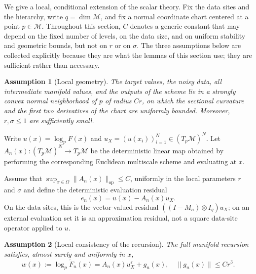 \documentclass[12pt]{article}
\newtheorem{assumption}{Assumption}[section]
\newcommand{\M}{\mathcal{M}}
\begin{document}
We give a local, conditional extension of the scalar theory. Fix the data sites and the hierarchy, write $q=\dim\M$, and fix a normal coordinate chart centered at a point $p\in\M$. Throughout this section, $C$ denotes a generic constant that may depend on the fixed number of levels, on the data size, and on uniform stability and geometric bounds, but not on $r$ or on $\sigma$. The three assumptions below are collected explicitly because they are what the lemmas of this section use; they are sufficient rather than necessary.

\begin{assumption}[Local geometry]\label{ass:geometry}
The target values, the noisy data, all intermediate manifold values, and the outputs of the scheme lie in a strongly convex normal neighborhood of $p$ of radius $Cr$, on which the sectional curvature and the first two derivatives of the chart are uniformly bounded. Moreover, $r,\sigma\leq1$ are sufficiently small.
\end{assumption}

Write $u(x)=\log_pF(x)$ and $u_X=(u(x_i))_{i=1}^N\in(T_p\M)^N$. Let $A_n(x):(T_p\M)^N\to T_p\M$ be the deterministic linear map obtained by performing the corresponding Euclidean multiscale scheme and evaluating at $x$. 

Assume that $\sup_{x\in\Omega}\|A_n(x)\|_{\mathrm{op}}\leq C$,
uniformly in the local parameters $r$ and $\sigma$ and define the deterministic evaluation residual
\[
    e_n(x)=u(x)-A_n(x)u_X.
\]
On the data sites, this is the vector-valued residual $((I-M_n)\otimes I_q)u_X$; on an external evaluation set it is an approximation residual, not a square data-site operator applied to $u$.

\begin{assumption}[Local consistency of the recursion]\label{ass:consistency}
The full manifold recursion satisfies, almost surely and uniformly in $x$,
\begin{equation}\label{eq:full-local-consistency}
 w(x):=\log_p\widetilde F_n(x)
      =A_n(x)u_X^\varepsilon+g_n(x),
 \quad \|g_n(x)\|\leq Cr^3 .
\end{equation}
\end{assumption}
\end{document}

